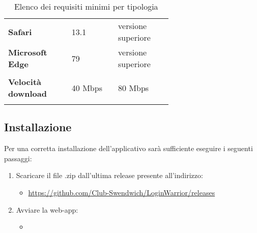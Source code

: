 {\begin{longtable}{>{\raggedright\arraybackslash}m{0.24\linewidth}m{0.20\linewidth}m{0.20\linewidth}}
    \rowcolor[RGB]{216, 235, 171}
    \textbf{Safari} & 13.1 & versione superiore \\

    \rowcolor[RGB]{233, 245, 206}
    \textbf{Microsoft Edge} & 79 & versione superiore \\

    \rowcolor[RGB]{47, 106, 73}
    \multicolumn{3}{>{\centering\arraybackslash}m{0.693\linewidth}}{\textcolor{white}{\textbf{Connessione}}}\\

    \rowcolor[RGB]{216, 235, 171}
    \textbf{Velocità download} & 40 Mbps & 80 Mbps \\
    
    \caption{Elenco dei requisiti minimi per tipologia}
\end{longtable}
}

\subsection{Installazione}

Per una corretta installazione dell'applicativo sarà sufficiente eseguire i seguenti passaggi:

\begin{enumerate}
    \item Scaricare il file .zip dall'ultima release presente all'indirizzo:
    \begin{itemize}
        \item \href{https://github.com/Club-Swendwich/LoginWarrior/releases}{https://github.com/Club-Swendwich/LoginWarrior/releases}
    \end{itemize}
    \item Avviare la web-app:
    \begin{itemize}
        \item 
    \end{itemize}
\end{enumerate}
